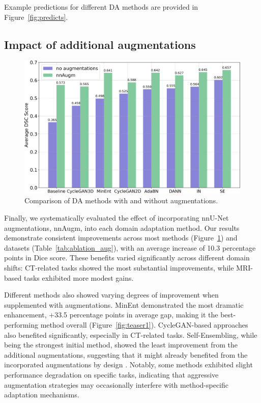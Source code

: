 Example predictions for different DA methods are provided in Figure~\ref{fig:predicts}.


\subsection{Impact of additional augmentations}



\begin{figure}[h]
	\centering
	\includegraphics[width=1\linewidth]{Dissertation/Figures/4_da_bench/augm.png}
	\caption{Comparison of DA methods with and without augmentations.}
	\label{fig:augm}
\end{figure}

Finally, we systematically evaluated the effect of incorporating nnU-Net augmentations, nnAugm, into each domain adaptation method. Our results demonstrate consistent improvements across most methods (Figure~\ref{fig:augm}) and datasets (Table~\ref{tab:ablation_aug}), with an average increase of 10.3 percentage points in Dice score. These benefits varied significantly across different domain shifts: CT-related tasks showed the most substantial improvements, while MRI-based tasks exhibited more modest gains.

Different methods also showed varying degrees of improvement when supplemented with augmentations. MinEnt demonstrated the most dramatic enhancement, +33.5 percentage points in average gap, making it the best-performing method overall (Figure~\ref{fig:teaser1}). CycleGAN-based approaches also benefited significantly, especially in CT-related tasks. Self-Ensembling, while being the strongest initial method, showed the least improvement from the additional augmentations, suggesting that it might already benefited from the incorporated augmentations by design \cite{se_medim}. Notably, some methods exhibited slight performance degradation on specific tasks, indicating that aggressive augmentation strategies may occasionally interfere with method-specific adaptation mechanisms.

